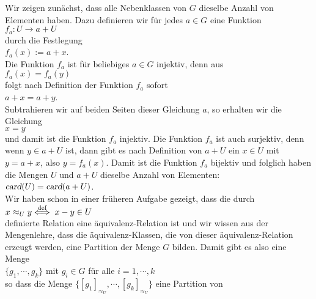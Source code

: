 \solution
Wir zeigen zun\"{a}chst, dass alle Nebenklassen von $G$ dieselbe Anzahl von Elementen haben.  Dazu
definieren wir f\"{u}r jedes $a \in G$ eine Funktion
\\[0.2cm]
\hspace*{1.3cm}
$f_a:U \rightarrow a + U$
\\[0.2cm]
durch die Festlegung
\\[0.2cm]
\hspace*{1.3cm}
$f_a(x) := a + x$.
\\[0.2cm]
Die Funktion $f_a$ ist f\"{u}r beliebiges $a \in G$ injektiv, denn aus
\\[0.2cm]
\hspace*{1.3cm}
$f_a(x) = f_a(y)$
\\[0.2cm]
folgt nach Definition der Funktion $f_a$ sofort
\\[0.2cm]
\hspace*{1.3cm}
$a + x = a + y$.
\\[0.2cm]
Subtrahieren wir auf beiden Seiten dieser Gleichung $a$, so erhalten wir die Gleichung
\\[0.2cm]
\hspace*{1.3cm}
$x = y$
\\[0.2cm]
und damit ist die Funktion $f_a$ injektiv.  Die Funktion $f_a$ ist auch surjektiv, denn wenn 
$y \in a + U$ ist, dann gibt es nach Definition von $a + U$ ein $x \in U$ mit $y = a + x$, also
$y = f_a(x)$.  Damit ist die Funktion $f_a$ bijektiv und folglich haben die Mengen $U$ und $a+U$
dieselbe Anzahl von Elementen:
\\[0.2cm]
\hspace*{1.3cm}
$\textsl{card}(U) = \textsl{card}(a + U)$.
\\[0.2cm]
Wir haben schon in einer fr\"{u}heren Aufgabe gezeigt, dass die durch
\\[0.2cm]
\hspace*{1.3cm}
$x \approx_U y \stackrel{\mbox{\scriptsize def}}{\Longleftrightarrow}\; x -y \in U$
\\[0.2cm]
definierte Relation eine \"{a}quivalenz-Relation ist und wir wissen aus der Mengenlehre, dass die
\"{a}quivalenz-Klassen, die von dieser \"{a}quivalenz-Relation erzeugt werden, eine Partition der Menge $G$
bilden.  Damit gibt es also eine Menge
\\[0.2cm]
\hspace*{1.3cm}
$\{g_1,\cdots, g_k\}$ \quad mit $g_i \in G$ f\"{u}r alle $i=1,\cdots,k$
\\[0.2cm]
so dass die Menge $\bigl\{ [g_1]_{\approx_U}, \cdots, [g_k]_{\approx_U}\bigr\}$ eine Partition von
